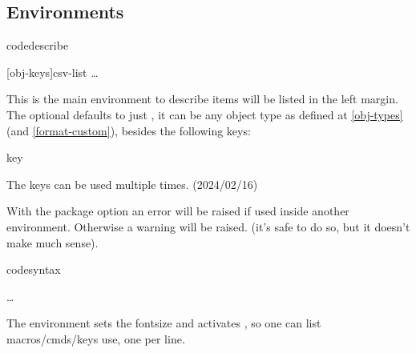 \documentclass{article}
\begin{document}
\subsection{Environments}\label{desc-env}

\begin{codedescribe}[env,new=2023/05/01,update=2023/05/01,note={a note example},update=2024/02/16,update=2025/09/25]{codedescribe}
\begin{codesyntax}
\tsmacro{\begin{codedescribe}}[obj-keys]{csv-list}
\ldots
\tsmacro{\end{codedescribe}}{}
\end{codesyntax}
This is the main environment to describe   items will be listed  in the left margin. The optional  defaults to just , it can be any object type as defined at \ref{obj-types} (and \ref{format-custom}), besides the following keys:
\begin{describelist*}{key}
\end{describelist*}
\end{codedescribe}
\begin{tsremark}
The keys  can be used multiple times. (2024/02/16)
\end{tsremark}
\begin{tsremark}
With the  package option
an error will be raised if used inside another  environment. Otherwise a warning will be raised. (it's safe to do so, but it doesn't make much sense).
\end{tsremark}

\begin{codedescribe}[env,update=2025/09/25]{codesyntax}
\begin{codesyntax}
\tsmacro{\begin{codesyntax}}{}
\ldots
\tsmacro{\end{codesyntax}}{}
\end{codesyntax}
The  environment sets the fontsize and activates \tsmacro{\obeylines,\obeyspaces}{}, so one can list macros/cmds/keys use, one per line.
\end{codedescribe}
\end{document}
